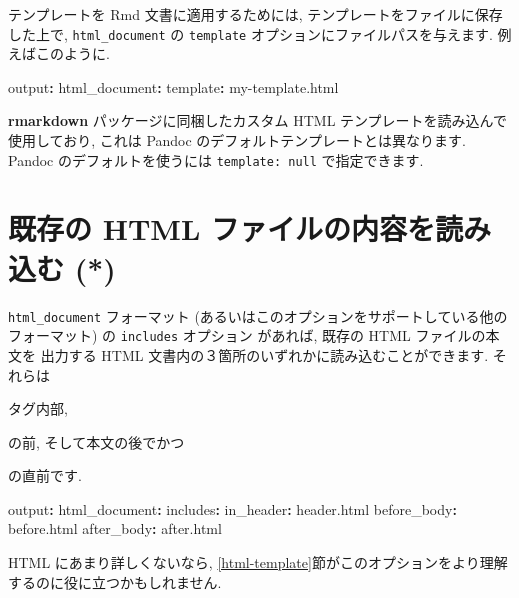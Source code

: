 \documentclass[
  11pt,
  lualatex,ja=standard,jafont=noto]{bxjsreport}
\newenvironment{Shaded}{\begin{snugshade}}{\end{snugshade}}
\newcommand{\AttributeTok}[1]{\textcolor[rgb]{0.77,0.63,0.00}{#1}}
\newcommand{\FunctionTok}[1]{\textcolor[rgb]{0.00,0.00,0.00}{#1}}
\newcommand{\KeywordTok}[1]{\textcolor[rgb]{0.13,0.29,0.53}{\textbf{#1}}}
\begin{document}
テンプレートを Rmd 文書に適用するためには, テンプレートをファイルに保存した上で, \texttt{html\_document} の \texttt{template} オプションにファイルパスを与えます. 例えばこのように.

\begin{Shaded}
\begin{Highlighting}[]
\FunctionTok{output}\KeywordTok{:}
\AttributeTok{  }\FunctionTok{html\_document}\KeywordTok{:}
\AttributeTok{    }\FunctionTok{template}\KeywordTok{:}\AttributeTok{ my{-}template.html}
\end{Highlighting}
\end{Shaded}

\textbf{rmarkdown} パッケージに同梱したカスタム HTML テンプレートを読み込んで使用しており, これは Pandoc のデフォルトテンプレートとは異なります. Pandoc のデフォルトを使うには \texttt{template: null} で指定できます.

\hypertarget{include-html}{%
\section{既存の HTML ファイルの内容を読み込む (*)}\label{include-html}}

\texttt{html\_document} フォーマット (あるいはこのオプションをサポートしている他のフォーマット) の \texttt{includes} オプション があれば, 既存の HTML ファイルの本文を 出力する HTML 文書内の３箇所のいずれかに読み込むことができます. それらは

タグ内部,

の前, そして本文の後でかつ

の直前です.

\begin{Shaded}
\begin{Highlighting}[]
\FunctionTok{output}\KeywordTok{:}
\AttributeTok{  }\FunctionTok{html\_document}\KeywordTok{:}
\AttributeTok{    }\FunctionTok{includes}\KeywordTok{:}
\AttributeTok{      }\FunctionTok{in\_header}\KeywordTok{:}\AttributeTok{ header.html}
\AttributeTok{      }\FunctionTok{before\_body}\KeywordTok{:}\AttributeTok{ before.html}
\AttributeTok{      }\FunctionTok{after\_body}\KeywordTok{:}\AttributeTok{ after.html}
\end{Highlighting}
\end{Shaded}

HTML にあまり詳しくないなら, \ref{html-template}節がこのオプションをより理解するのに役に立つかもしれません.
\end{document}

